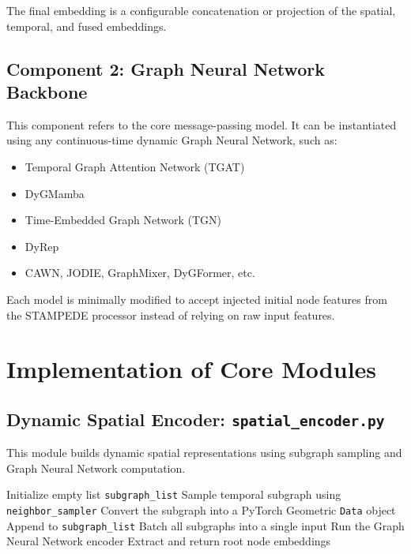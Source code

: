 \documentclass[11pt, a4paper]{article}
\begin{document}
The final embedding is a configurable concatenation or projection of the spatial, temporal, and fused embeddings.

\subsection{Component 2: Graph Neural Network Backbone}
This component refers to the core message-passing model. It can be instantiated using any continuous-time dynamic Graph Neural Network, such as:

\begin{itemize}
    \item Temporal Graph Attention Network (TGAT)
    \item DyGMamba
    \item Time-Embedded Graph Network (TGN)
    \item DyRep
    \item CAWN, JODIE, GraphMixer, DyGFormer, etc.
\end{itemize}

Each model is minimally modified to accept injected initial node features from the STAMPEDE processor instead of relying on raw input features.

\section{Implementation of Core Modules}

\subsection{Dynamic Spatial Encoder: \texttt{spatial\_encoder.py}}
This module builds dynamic spatial representations using subgraph sampling and Graph Neural Network computation.

\begin{algorithmic}[1]
    \State Initialize empty list \texttt{subgraph\_list}
        \State Sample temporal subgraph using \texttt{neighbor\_sampler}
        \State Convert the subgraph into a PyTorch Geometric \texttt{Data} object
        \State Append to \texttt{subgraph\_list}
    \EndFor
    \State Batch all subgraphs into a single input
    \State Run the Graph Neural Network encoder
    \State Extract and return root node embeddings
\EndFunction
\end{algorithmic}
\end{document}
